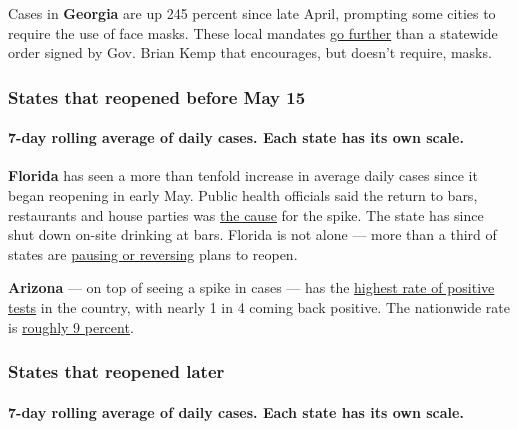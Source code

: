 Cases in \textbf{Georgia} are up 245 percent since late April, prompting
some cities to require the use of face masks. These local mandates
\href{https://www.ajc.com/news/state--regional-govt--politics/growing-number-georgia-cities-require-masks-over-kemp-objection/rLK5RODzq1EVJiyebeIi2H/}{go
further} than a statewide order signed by Gov. Brian Kemp that
encourages, but doesn't require, masks.

\hypertarget{states-that-reopened-before-may-15}{%
\subsubsection{States that reopened before May
15}\label{states-that-reopened-before-may-15}}

\hypertarget{7-day-rolling-average-of-daily-cases-each-state-has-its-own-scale-1}{%
\paragraph{7-day rolling average of daily cases. Each state has its own
scale.}\label{7-day-rolling-average-of-daily-cases-each-state-has-its-own-scale-1}}

\textbf{Florida} has seen a more than tenfold increase in average daily
cases since it began reopening in early May. Public health officials
said the return to bars, restaurants and house parties was
\href{https://www.nytimes.com/2020/07/06/us/coronavirus-florida-miami.html}{the
cause} for the spike. The state has since shut down on-site drinking at
bars. Florida is not alone --- more than a third of states are
\href{https://www.nytimes.com/interactive/2020/us/states-reopen-map-coronavirus.html}{pausing
or reversing} plans to reopen.

\textbf{Arizona} --- on top of seeing a spike in cases --- has the
\href{https://www.azcentral.com/story/news/local/arizona-health/2020/07/07/why-arizonas-percent-positive-tests-highest-country/5386600002/}{highest
rate of positive tests} in the country, with nearly 1 in 4 coming back
positive. The nationwide rate is
\href{https://www.cdc.gov/coronavirus/2019-ncov/cases-updates/testing-in-us.html}{roughly
9 percent}.

\hypertarget{states-that-reopened-later}{%
\subsubsection{States that reopened
later}\label{states-that-reopened-later}}

\hypertarget{7-day-rolling-average-of-daily-cases-each-state-has-its-own-scale-2}{%
\paragraph{7-day rolling average of daily cases. Each state has its own
scale.}\label{7-day-rolling-average-of-daily-cases-each-state-has-its-own-scale-2}}

